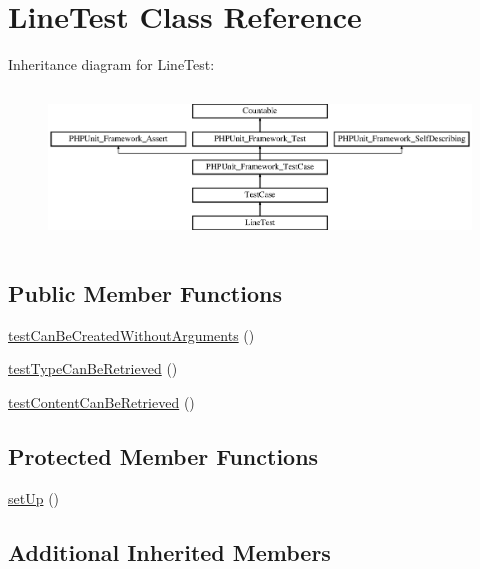 \hypertarget{class_sebastian_bergmann_1_1_diff_1_1_line_test}{}\section{Line\+Test Class Reference}
\label{class_sebastian_bergmann_1_1_diff_1_1_line_test}
Inheritance diagram for Line\+Test\+:\begin{figure}[H]
\begin{center}
\leavevmode
\includegraphics[height=4.129793cm]{class_sebastian_bergmann_1_1_diff_1_1_line_test}
\end{center}
\end{figure}
\subsection*{Public Member Functions}
\begin{DoxyCompactItemize}
\item 
\mbox{\hyperlink{class_sebastian_bergmann_1_1_diff_1_1_line_test_a5576421ac12ca6e91ead5189893523bf}{test\+Can\+Be\+Created\+Without\+Arguments}} ()
\item 
\mbox{\hyperlink{class_sebastian_bergmann_1_1_diff_1_1_line_test_a52d0671790deca83324471d8c1a28065}{test\+Type\+Can\+Be\+Retrieved}} ()
\item 
\mbox{\hyperlink{class_sebastian_bergmann_1_1_diff_1_1_line_test_a36962f647115c02a95557eb8fd01c555}{test\+Content\+Can\+Be\+Retrieved}} ()
\end{DoxyCompactItemize}
\subsection*{Protected Member Functions}
\begin{DoxyCompactItemize}
\item 
\mbox{\hyperlink{class_sebastian_bergmann_1_1_diff_1_1_line_test_a0bc688732d2b3b162ffebaf7812e78da}{set\+Up}} ()
\end{DoxyCompactItemize}
\subsection*{Additional Inherited Members}


